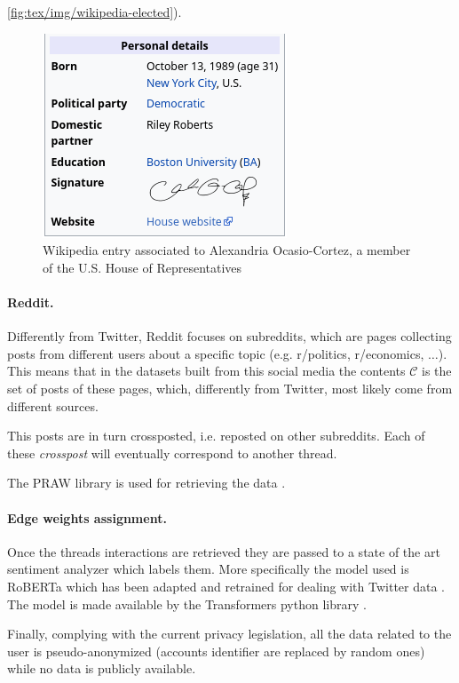 \autoref{fig:tex/img/wikipedia-elected}).
\begin{figure}
	\centering
	\includegraphics[width=0.4\linewidth]{tex/img/wikipedia-elected.png}
	\caption[Example Wikipedia entry]{Wikipedia entry associated to Alexandria Ocasio-Cortez, a member
		of the U.S. House of Representatives}%
	\label{fig:tex/img/wikipedia-elected}
\end{figure}

\paragraph{Reddit.}%
\label{par:reddit}

Differently from Twitter, Reddit focuses on subreddits, which are pages
collecting posts from different users about a specific topic (e.g. r/politics,
r/economics, $\dots$). This means that
in the datasets built from this social media the contents $\mathcal{C} $ is the
set of posts of these pages, which, differently from Twitter, most likely
come from different sources.

This posts are in turn crossposted, i.e. reposted on other subreddits. Each of
these \emph{crosspost} will eventually correspond to another thread.

The PRAW library is used for retrieving the data \cite{praw}.

\paragraph{Edge weights assignment.}%
\label{par:assigning_edge_weights}

Once the threads interactions are retrieved they are passed to a state of the
art sentiment analyzer which labels them. More specifically the model used is
RoBERTa which has been adapted and retrained for dealing with Twitter
data \cite{Barbieri2020}. The model is made available by the Transformers
python library \cite{wolf-etal-2020-transformers}.

\bigskip

Finally, complying with the current privacy legislation, all the data related
to the user is pseudo-anonymized (accounts identifier are replaced by random
ones) while no data is publicly available.

